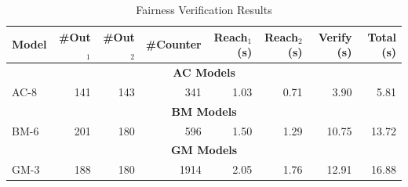 \begin{table}[htbp]
\centering
\begin{tabular}{|l|r|r|r|r|r|r|r|}
\hline
Model & \#Out$_1$ & \#Out$_2$ & \#Counter & Reach$_1$ (s) & Reach$_2$ (s) & Verify (s) & Total (s) \\
\hline
\multicolumn{8}{|c|}{\textbf{AC Models}} \\
\hline
AC-8 & 141 & 143 & 341 & 1.03 & 0.71 & 3.90 & 5.81 \\
\hline
\multicolumn{8}{|c|}{\textbf{BM Models}} \\
\hline
BM-6 & 201 & 180 & 596 & 1.50 & 1.29 & 10.75 & 13.72 \\
\hline
\multicolumn{8}{|c|}{\textbf{GM Models}} \\
\hline
GM-3 & 188 & 180 & 1914 & 2.05 & 1.76 & 12.91 & 16.88 \\
\hline
\end{tabular}
\caption{Fairness Verification Results}
\label{tab:fairness-results}
\end{table}